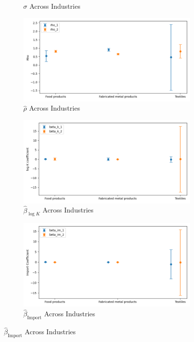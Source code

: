 \documentclass{article}
\begin{document}
\begin{figure}[ht!]
\begin{subfigure}[t]{0.32\textwidth}
        \caption{$\hat\sigma$ Across Industries}
    \end{subfigure}
    \begin{subfigure}[t]{0.32\textwidth}
        \centering
        \includegraphics[width=\textwidth]{figure/ar1_normal_kmshare_ciiu_rho_across_industries.png}
        \caption{$\hat\rho$ Across Industries}
    \end{subfigure}
    \begin{subfigure}[t]{0.32\textwidth}
        \centering
        \includegraphics[width=\textwidth]{figure/ar1_normal_kmshare_ciiu_beta_k_across_industries.png}
        \caption{$\hat{\beta}_{\log K}$ Across Industries}
    \end{subfigure}
    \begin{subfigure}[t]{0.32\textwidth}
        \centering
        \includegraphics[width=\textwidth]{figure/ar1_normal_kmshare_ciiu_beta_im_across_industries.png}
        \caption{$\hat{\beta}_{\text{Import}}$ Across Industries}
    \end{subfigure}
\end{figure}
\end{document}
